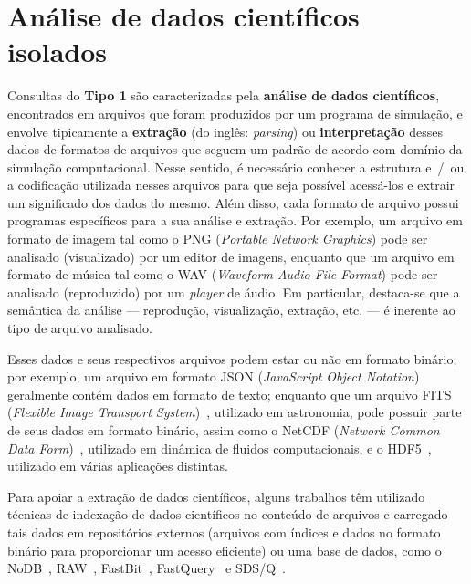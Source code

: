 \section{Análise de dados científicos isolados}%
\label{sec:analise-de-dados-cientificos-isolados}

Consultas do \textbf{Tipo 1} são caracterizadas pela \textbf{análise de dados científicos}, encontrados em arquivos que foram produzidos por um programa de simulação, e envolve tipicamente a \textbf{extração} (do inglês: \textit{parsing}) ou \textbf{interpretação} desses dados de formatos de arquivos que seguem um padrão de acordo com domínio da simulação computacional. Nesse sentido, é necessário conhecer a estrutura e~/~ou a codificação utilizada nesses arquivos para que seja possível acessá-los e extrair um significado dos dados do mesmo. Além disso, cada formato de arquivo possui programas específicos para a sua análise e extração. Por exemplo, um arquivo em formato de imagem tal como o  PNG (\textit{Portable Network Graphics}) pode ser analisado (visualizado) por um editor de imagens, enquanto que um arquivo em formato de música tal como o  WAV (\textit{Waveform Audio File Format}) pode ser analisado (reproduzido) por um \textit{player} de áudio. Em particular, destaca-se que a semântica da análise --- reprodução, visualização, extração, etc. --- é inerente ao tipo de arquivo analisado.

Esses dados e seus respectivos arquivos podem estar ou não em formato binário; por exemplo, um arquivo em formato  JSON (\textit{JavaScript Object Notation}) geralmente contém dados em formato de texto; enquanto que um arquivo FITS (\textit{Flexible Image Transport System})~\cite{greisen2002representations}, utilizado em astronomia, pode possuir parte de seus dados em formato binário, assim como o NetCDF (\textit{Network Common Data Form})~\cite{rew1990netcdf}, utilizado em dinâmica de fluidos computacionais, e o HDF5~\cite{folk1999hdf5}, utilizado em várias aplicações distintas.

Para apoiar a extração de dados científicos, alguns trabalhos têm utilizado técnicas de indexação de dados científicos no conteúdo de arquivos e carregado tais dados em repositórios externos (arquivos com índices e dados no formato binário para proporcionar um acesso eficiente) ou uma base de dados, como o NoDB~\cite{alagiannis2012nodb}, RAW~\cite{karpathiotakis2014adaptive}, FastBit~\cite{wu2009fastbit}, FastQuery~\cite{chou2011parallel} e SDS/Q~\cite{blanas2014parallel}.

